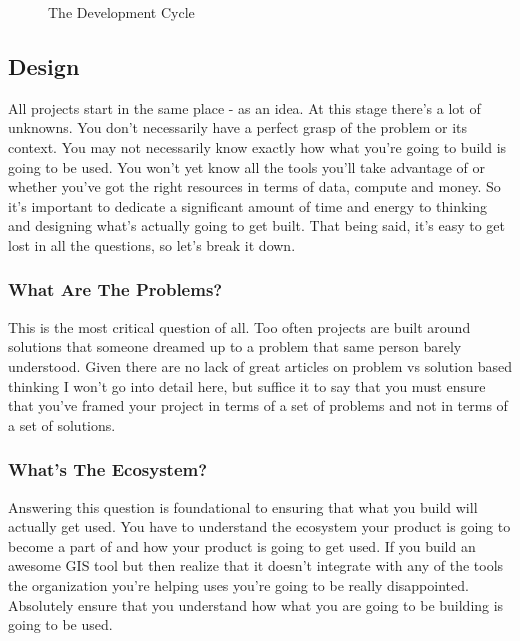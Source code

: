 \documentclass[10pt,a5paper]{book}
\begin{document}
\begin{figure}[!htb]
\caption{\label{fig:my-label} The Development Cycle}
\end{figure}


\subsection{Design}
All projects start in the same place - as an idea. At this stage there's a lot of unknowns. You don't necessarily have a perfect grasp of the problem or its context. You may not necessarily know exactly how what you're going to build is going to be used. You won't yet know all the tools you'll take advantage of or whether you've got the right resources in terms of data, compute and money. So it's important to dedicate a significant amount of time and energy to thinking and designing what's actually going to get built. That being said, it's easy to get lost in all the questions, so let's break it down. 

\subsubsection{What Are The Problems?}
This is the most critical question of all. Too often projects are built around solutions that someone dreamed up to a problem that same person barely understood. Given there are no lack of great articles on problem vs solution based thinking I won't go into detail here, but suffice it to say that you must ensure that you've framed your project in terms of a set of problems and not in terms of a set of solutions. 

\subsubsection{What's The Ecosystem?}
Answering this question is foundational to ensuring that what you build will actually get used. You have to understand the ecosystem your product is going to become a part of and how your product is going to get used. If you build an awesome GIS tool but then realize that it doesn't integrate with any of the tools the organization you're helping uses you're going to be really disappointed. Absolutely ensure that you understand how what you are going to be building is going to be used.
\end{document}
